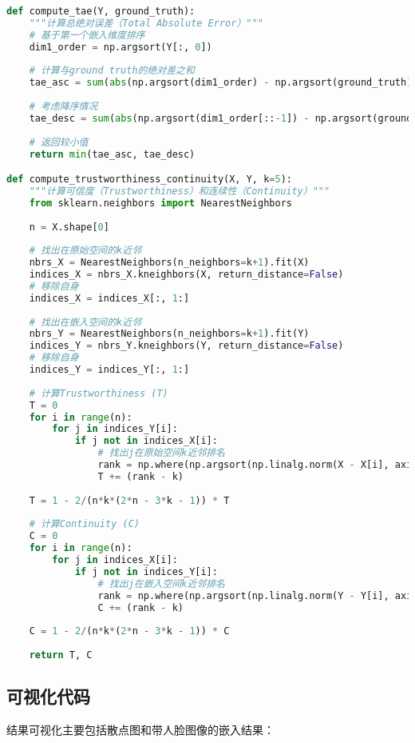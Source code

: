 \documentclass{article}
\begin{document}
\begin{lstlisting}[language=Python]
def compute_tae(Y, ground_truth):
    """计算总绝对误差（Total Absolute Error）"""
    # 基于第一个嵌入维度排序
    dim1_order = np.argsort(Y[:, 0])
    
    # 计算与ground truth的绝对差之和
    tae_asc = sum(abs(np.argsort(dim1_order) - np.argsort(ground_truth)))
    
    # 考虑降序情况
    tae_desc = sum(abs(np.argsort(dim1_order[::-1]) - np.argsort(ground_truth)))
    
    # 返回较小值
    return min(tae_asc, tae_desc)

def compute_trustworthiness_continuity(X, Y, k=5):
    """计算可信度（Trustworthiness）和连续性（Continuity）"""
    from sklearn.neighbors import NearestNeighbors
    
    n = X.shape[0]
    
    # 找出在原始空间的k近邻
    nbrs_X = NearestNeighbors(n_neighbors=k+1).fit(X)
    indices_X = nbrs_X.kneighbors(X, return_distance=False)
    # 移除自身
    indices_X = indices_X[:, 1:]
    
    # 找出在嵌入空间的k近邻
    nbrs_Y = NearestNeighbors(n_neighbors=k+1).fit(Y)
    indices_Y = nbrs_Y.kneighbors(Y, return_distance=False)
    # 移除自身
    indices_Y = indices_Y[:, 1:]
    
    # 计算Trustworthiness (T)
    T = 0
    for i in range(n):
        for j in indices_Y[i]:
            if j not in indices_X[i]:
                # 找出j在原始空间k近邻排名
                rank = np.where(np.argsort(np.linalg.norm(X - X[i], axis=1))==j)[0][0]
                T += (rank - k)
    
    T = 1 - 2/(n*k*(2*n - 3*k - 1)) * T
    
    # 计算Continuity (C)
    C = 0
    for i in range(n):
        for j in indices_X[i]:
            if j not in indices_Y[i]:
                # 找出j在嵌入空间k近邻排名
                rank = np.where(np.argsort(np.linalg.norm(Y - Y[i], axis=1))==j)[0][0]
                C += (rank - k)
    
    C = 1 - 2/(n*k*(2*n - 3*k - 1)) * C
    
    return T, C
\end{lstlisting}

\subsection{可视化代码}

结果可视化主要包括散点图和带人脸图像的嵌入结果：
\end{document}
